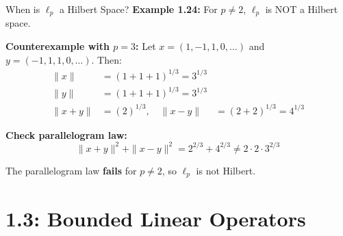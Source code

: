 \documentclass[aspectratio=169,10pt]{beamer}
\begin{document}
\begin{frame}{When is $\ell_p$ a Hilbert Space?}
  \textbf{Example 1.24:} For $p \neq 2$, $\ell_p$ is NOT a Hilbert space.

  \vspace{0.3cm}
  \textbf{Counterexample with $p = 3$:}
  Let $x = (1, -1, 1, 0, \ldots)$ and $y = (-1, 1, 1, 0, \ldots)$. Then:
  \begin{align*}
    \|x\| &= (1 + 1 + 1)^{1/3} = 3^{1/3} \\
    \|y\| &= (1 + 1 + 1)^{1/3} = 3^{1/3} \\
    \|x + y\| &= (2)^{1/3}, \quad \|x - y\| &= (2 + 2)^{1/3} = 4^{1/3}
  \end{align*}

  \vspace{0.2cm}
  \textbf{Check parallelogram law:}
  $$\|x+y\|^2 + \|x-y\|^2 = 2^{2/3} + 4^{2/3} \neq 2 \cdot 2 \cdot 3^{2/3}$$

  \vspace{0.2cm}
  The parallelogram law \textbf{fails} for $p \neq 2$, so $\ell_p$ is not Hilbert.

  \vspace{0.2cm}
\end{frame}


\section{1.3: Bounded Linear Operators}
\end{document}
